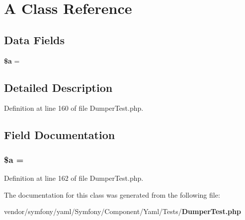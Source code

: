\section{A Class Reference}
\label{class_symfony_1_1_component_1_1_yaml_1_1_tests_1_1_a}
\subsection*{Data Fields}
\begin{DoxyCompactItemize}
\item 
{\bf \$a} = \textquotesingle{}
\end{DoxyCompactItemize}


\subsection{Detailed Description}


Definition at line 160 of file Dumper\+Test.\+php.



\subsection{Field Documentation}
\subsubsection[{\$a}]{\setlength{\rightskip}{0pt plus 5cm}\${\bf a} = \textquotesingle{}}\label{class_symfony_1_1_component_1_1_yaml_1_1_tests_1_1_a_acebf83966ef6d7e5645a6b62ba368f9f}


Definition at line 162 of file Dumper\+Test.\+php.



The documentation for this class was generated from the following file\+:\begin{DoxyCompactItemize}
\item 
vendor/symfony/yaml/\+Symfony/\+Component/\+Yaml/\+Tests/{\bf Dumper\+Test.\+php}\end{DoxyCompactItemize}
